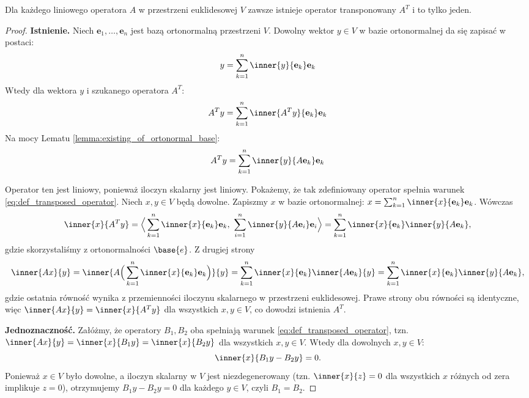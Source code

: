 \begin{theorem}
Dla każdego liniowego operatora $A$ w przestrzeni euklidesowej $V$ zawsze istnieje operator transponowany $A^T$ i to tylko jeden.
\end{theorem}
\begin{proof}
\textbf{Istnienie.} Niech $\mathbf{e}_1, \ldots, \mathbf{e}_n$ jest bazą ortonormalną przestrzeni $V$. Dowolny wektor $y \in V$ w bazie ortonormalnej da się zapisać w postaci:
$$ y = \sum_{k=1}^{n}{\inner{y}{\mathbf{e}_k}\mathbf{e}_k} $$
    Wtedy dla wektora $y$ i szukanego operatora $A^T$:
\begin{equation}
        A^Ty = \sum_{k=1}^{n}{\inner{A^Ty}{\mathbf{e}_k}\mathbf{e}_k}
\end{equation}
    Na mocy Lematu \ref{lemma:existing_of_ortonormal_base}:
\begin{equation}
        A^Ty = \sum_{k=1}^{n}{\inner{y}{A\mathbf{e}_k}\mathbf{e}_k}
\end{equation}

Operator ten jest liniowy, ponieważ iloczyn skalarny jest liniowy.
Pokażemy, że tak zdefiniowany operator spełnia warunek \eqref{eq:def_transposed_operator}. Niech $x, y \in V$ będą dowolne. Zapiszmy $x$ w bazie ortonormalnej: $x = \sum_{k=1}^n \inner{x}{\mathbf{e}_k}\mathbf{e}_k$. Wówczas
\begin{equation}
    \inner{x}{A^Ty} = \Big\langle \sum_{k=1}^n \inner{x}{\mathbf{e}_k}\mathbf{e}_k,\ \sum_{i=1}^n \inner{y}{A\mathbf{e}_i}\mathbf{e}_i \Big\rangle = \sum_{k=1}^n \inner{x}{\mathbf{e}_k}\inner{y}{A\mathbf{e}_k},
\end{equation}
gdzie skorzystaliśmy z ortonormalności $\base{e}$. 
Z drugiej strony
\begin{equation}
    \inner{Ax}{y} = \inner{
        A\Big(\sum_{k=1}^n \inner{x}{\mathbf{e}_k}\mathbf{e}_k\Big)
    }{y} = \sum_{k=1}^n \inner{x}{\mathbf{e}_k}\inner{A\mathbf{e}_k}{y} = \sum_{k=1}^n \inner{x}{\mathbf{e}_k}\inner{y}{A\mathbf{e}_k},
\end{equation}
gdzie ostatnia równość wynika z przemienności iloczynu skalarnego w przestrzeni euklidesowej. 
Prawe strony obu równości są identyczne, więc $\inner{Ax}{y} = \inner{x}{A^Ty}$ dla wszystkich $x,y \in V$, co dowodzi istnienia $A^T$.

\textbf{Jednoznaczność.} Załóżmy, że operatory $B_1, B_2$ oba spełniają warunek \eqref{eq:def_transposed_operator}, tzn. $\inner{Ax}{y} = \inner{x}{B_1y} = \inner{x}{B_2y}$ dla wszystkich $x,y \in V$. Wtedy dla dowolnych $x, y \in V$:
\begin{equation}
    \inner{x}{B_1y - B_2y} = 0.
\end{equation}
Ponieważ $x \in V$ było dowolne, a iloczyn skalarny w $V$ jest niezdegenerowany (tzn. $\inner{x}{z}=0$ dla wszystkich $x$ różnych od zera implikuje $z=0$), otrzymujemy $B_1y - B_2y = 0$ dla każdego $y \in V$, czyli $B_1 = B_2$.
\end{proof}

